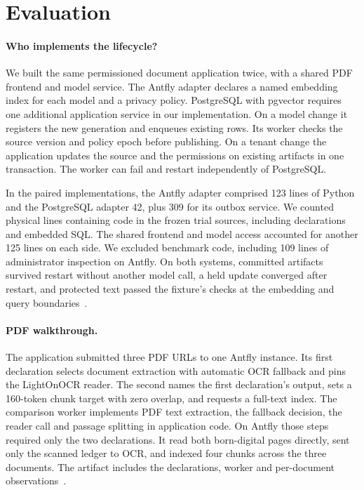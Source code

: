 \documentclass[sigconf,nonacm]{acmart}
\begin{document}
\section{Evaluation}
\label{sec:eval}

\paragraph{Who implements the lifecycle?} We built the same permissioned
document application twice, with a shared PDF frontend and model service.
The Antfly adapter declares a named embedding index for each model and a
privacy policy. PostgreSQL with pgvector requires one additional application
service in our implementation. On a model change it registers the new
generation and enqueues existing rows. Its worker checks the source version
and policy epoch before publishing. On a tenant change the application
updates the source and the permissions on existing artifacts in one
transaction. The worker can fail and restart independently of PostgreSQL.

In the paired implementations, the Antfly adapter comprised 123 lines of
Python and the PostgreSQL adapter 42, plus 309 for its outbox service.
We counted physical lines containing code in the frozen trial sources,
including declarations and embedded SQL. The shared frontend and model
access accounted for another 125 lines on each side. We excluded benchmark
code, including 109 lines of administrator inspection on Antfly.
On both systems, committed artifacts survived restart without another
model call, a held update converged after restart, and protected text
passed the fixture's checks at the embedding and query boundaries~\cite{antfly-paper-repo}.

\paragraph{PDF walkthrough.} The application submitted
three PDF URLs to one Antfly instance. Its first declaration selects
document extraction with automatic OCR fallback and pins the LightOnOCR
reader. The second names the first declaration's output, sets a 160-token
chunk target with zero overlap, and requests a full-text index. The
comparison worker implements PDF text extraction, the fallback decision,
the reader call and passage splitting in application code. On Antfly those
steps required only the two declarations. It read both born-digital pages
directly, sent only the scanned ledger to OCR, and indexed four chunks
across the three documents. The artifact includes the declarations, worker
and per-document observations~\cite{antfly-paper-repo}.
\end{document}
